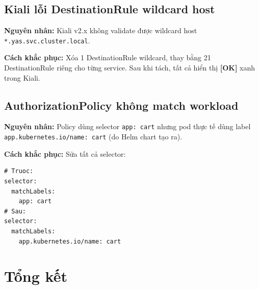 \subsection{Kiali lỗi DestinationRule wildcard host}

\textbf{Nguyên nhân:} Kiali v2.x không validate được wildcard host
\texttt{*.yas.svc.cluster.local}.

\textbf{Cách khắc phục:} Xóa 1 DestinationRule wildcard, thay bằng 21 DestinationRule
riêng cho từng service. Sau khi tách, tất cả hiển thị \textbf{[OK]} xanh trong Kiali.

\subsection{AuthorizationPolicy không match workload}

\textbf{Nguyên nhân:} Policy dùng selector \texttt{app: cart} nhưng pod thực tế
dùng label \texttt{app.kubernetes.io/name: cart} (do Helm chart tạo ra).

\textbf{Cách khắc phục:} Sửa tất cả selector:
\begin{lstlisting}[style=yamlstyle]
# Truoc:
selector:
  matchLabels:
    app: cart
# Sau:
selector:
  matchLabels:
    app.kubernetes.io/name: cart
\end{lstlisting}

\section{Tổng kết}

